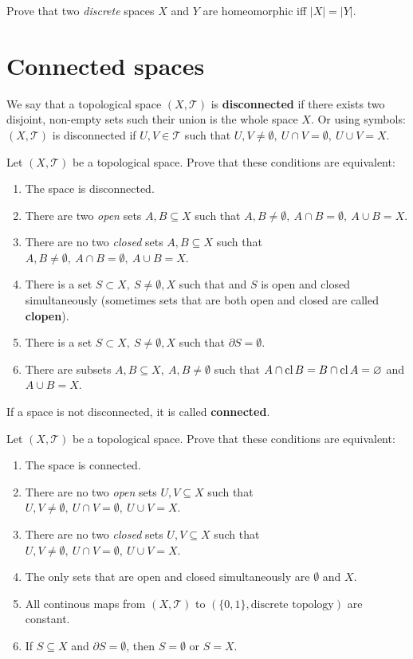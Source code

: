 \begin{prob}
  Prove that two \textit{discrete} spaces $X$ and $Y$ are homeomorphic iff $|X|=|Y|.$
\end{prob}

\section{Connected spaces}
We say that a topological space $(X, \mathcal T)$ is \textbf{disconnected} if there exists two disjoint, non-empty sets such their union is the whole space $X$. Or using symbols:
$(X, \mathcal T)$ is disconnected if $U,V\in \mathcal T$ such that $U,V\neq \emptyset,~U\cap V =\emptyset,~U\cup V=X$.
\begin{prob}
  Let $(X, \mathcal T)$ be a topological space. Prove that these conditions are equivalent:
  \begin{enumerate}
    \item The space is disconnected.
    \item There are two \textit{open} sets $A,B\subseteq X$ such that $A,B\neq \emptyset,~A\cap B=\emptyset,~A\cup B=X$.
    \item There are no two \textit{closed} sets $A,B\subseteq X$ such that $A,B\neq \emptyset,~A\cap B=\emptyset,~A\cup B=X$.
    \item There is a set $S\subset X,~S\neq \emptyset, X$ such that and $S$ is open and closed simultaneously (sometimes sets that are both open and closed are called
    \textbf{clopen}).
    \item There is a set $S\subset X,~S\neq \emptyset, X$ such that $\partial S=\emptyset$.
    \item There are subsets $A,B\subseteq X,~ A,B\neq \emptyset$ such that $A\cap \text{cl\,} B = B\cap \text{cl\,} A=\varnothing$ and $A\cup B=X$.
  \end{enumerate}
\end{prob}

If a space is not disconnected, it is called \textbf{connected}.

\begin{prob}
  Let $(X, \mathcal T)$ be a topological space. Prove that these conditions are equivalent:
  \begin{enumerate}
    \item The space is connected.
    \item There are no two \textit{open} sets $U,V\subseteq X$ such that $U,V\neq \emptyset,~U\cap V=\emptyset,~U\cup V=X$.
    \item There are no two \textit{closed} sets $U,V\subseteq X$ such that $U,V\neq \emptyset,~U\cap V=\emptyset,~U\cup V=X$.
    \item The only sets that are open and closed simultaneously are $\emptyset$ and $X$.
    \item All continous maps from $(X, \mathcal T)$ to $(\{0,1\}, \text{discrete topology})$ are constant.
    \item If $S\subseteq X$ and $\partial S=\emptyset$, then $S=\emptyset$ or $S=X$.
  \end{enumerate}
\end{prob}
